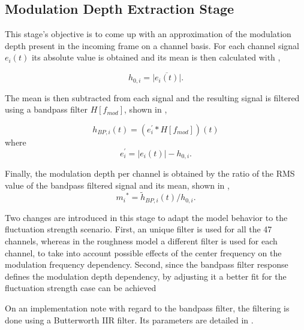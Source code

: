 \documentclass[../main.tex]{subfiles}
\begin{document}
\begin{modelchapter}
\subsection{Modulation Depth Extraction Stage}

This stage's objective is to come up with an approximation of the modulation
depth present in the incoming frame on a channel basis. For each channel signal
$e_{i}(t)$ its absolute value is obtained and its mean is then calculated with
,

\begin{equation}
  h_{0,i} = \overline{|e_{i}(t)|}.
  \label{eq:h0i}
\end{equation}

The mean is then subtracted from each signal and the resulting signal is
filtered using a bandpass filter $H[f_{mod}]$, shown in ,

\begin{equation}
  h_{BP,i}(t) = (e_{i}^{\prime} * H[f_{mod}])(t)
  \label{eq:hBPi}
\end{equation}
where
\begin{equation}
  e_{i}^{\prime} = |e_{i}(t)| - h_{0,i}.
\end{equation}

Finally, the modulation depth per channel is obtained by the ratio of the
\gls{RMS} value of the bandpass filtered signal and its mean, shown in
,
\begin{equation}
  {m_i}^* = \tilde{h}_{BP,i}(t)/h_{0,i}.
  \label{eq:mi*}
\end{equation}

Two changes are introduced in this stage to adapt the model behavior to the
fluctuation strength scenario. First, an unique filter is used for all the 47
channels, whereas in the roughness model a different filter is used for each
channel, to take into account possible effects of the center frequency on the
modulation frequency dependency. Second, since the bandpass filter response
defines the modulation depth dependency, by adjusting it a better fit for the
fluctuation strength case can be achieved

On an implementation note with regard to the bandpass filter, the filtering is
done using a Butterworth \gls{IIR} filter. Its parameters are detailed in
.


\end{modelchapter}
\end{document}
